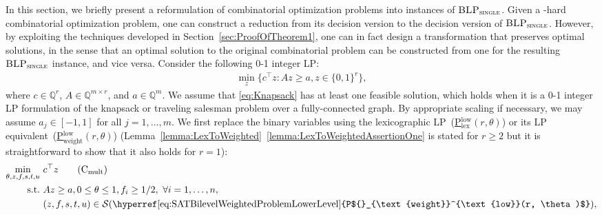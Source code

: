 \documentclass[runningheads,orivec]{llncs}
\newcommand{\MacroColor}[1]{#1}
\newcommand{\ComplexityClassStyle}[1]{#1}
\newcommand{\ClassNP}{\MacroColor{\text{\ComplexityClassStyle{NP}}}}
\newcommand{\BLPWithSingleUpperLevelVariable}{\MacroColor{$\textsc{BLP}_{\textsc{single}}$}}
\newcommand{\NConstraints}{\MacroColor{m}}
\newcommand{\IPNVariables}{\MacroColor{r}}
\newcommand{\OptSolSet}{\MacroColor{\mathcal{S}}}
\newcommand{\ReformZ}{\MacroColor{z}}
\newcommand{\ReformAugFrac}{\MacroColor{f}}
\newcommand{\LexUVar}{\MacroColor{\theta}}
\newcommand{\LexLVarS}{\MacroColor{s}}
\newcommand{\LexLVarT}{\MacroColor{t}}
\newcommand{\LexLVarU}{\MacroColor{u}}
\begin{document}
In this section, we briefly present a reformulation of combinatorial optimization problems into instances of \BLPWithSingleUpperLevelVariable{}.
\label{Rev:MotivationOfReformulationOfCombProblem} Given a \ClassNP{}-hard combinatorial optimization problem, one can construct a reduction from its decision version to the decision version of \BLPWithSingleUpperLevelVariable{}.
However, by exploiting the techniques developed in Section~\ref{sec:ProofOfTheorem1}, one can in fact design a transformation that preserves optimal solutions, in the sense that an optimal solution to the original combinatorial problem can be constructed from one for the resulting \BLPWithSingleUpperLevelVariable{} instance, and vice versa.
Consider the following 0-1 integer LP:
\begin{align}
\min_{\ReformZ} \{ c^{\top} \ReformZ 
:
A \ReformZ \ge a, \ReformZ \in \{0, 1\}^\IPNVariables\},
\tag{C}
\label{eq:Knapsack}
\end{align}
where $c \in \mathbb{Q}^{\IPNVariables}$, $A \in \mathbb{Q}^{\NConstraints \times \IPNVariables}$, and $a \in \mathbb{Q}^{\NConstraints}$.  
We assume that \eqref{eq:Knapsack} has at least one feasible solution, which holds when it is a 0-1 integer LP formulation of the knapsack or traveling salesman problem over a fully-connected graph.
By appropriate scaling if necessary, we may assume $a_j \in [-1,1]$ for all $j = 1, \ldots, \NConstraints$.  
We first replace the binary variables using the lexicographic LP~(\hyperref[eq:SATBilevelLexProgrammingLowerLevel]{P${}_{\text{lex}}^{\text{low}}(\IPNVariables, \LexUVar)$}) or its LP equivalent~(\hyperref[eq:SATBilevelWeightedProblemLowerLevel]{P${}_{\text{weight}}^{\text{low}}(\IPNVariables, \LexUVar)$}) (Lemma~\ref{lemma:LexToWeighted}~\ref{lemma:LexToWeightedAssertionOne} is stated for $\IPNVariables \ge 2$ but it is straightforward to show that it also holds for $\IPNVariables = 1$):
\begin{align}
\min_{\LexUVar, \ReformZ, \ReformAugFrac, \LexLVarS, \LexLVarT, \LexLVarU} \ & c^{\top} \ReformZ 
\tag{C$_{\text{mult}}$}
\label{eq:KnapsackMiddle}
\\
\text{s.t.} \ 
&
A \ReformZ \ge a, 0 \le \LexUVar \le 1, \ReformAugFrac_{i} \ge 1/2, \ \forall i = 1, \ldots, n,
\label{eq:KnapsackBLPWithUpperLevelConstraintConstraint}
\\
&
(\ReformZ, \ReformAugFrac, \LexLVarS, \LexLVarT, \LexLVarU) \in 
\OptSolSet(\text{\hyperref[eq:SATBilevelWeightedProblemLowerLevel]{P${}_{\text{weight}}^{\text{low}}(\IPNVariables, \LexUVar)$}}),
\notag
\end{align}
\end{document}
